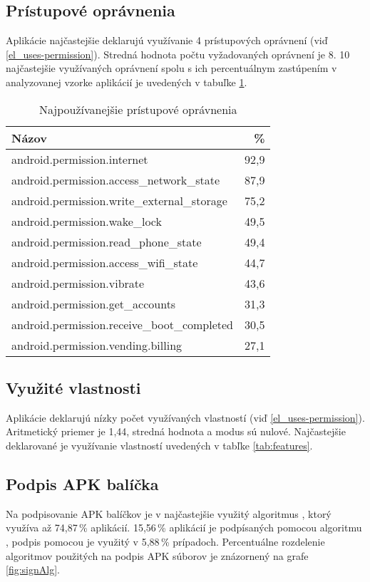 \subsection*{Prístupové oprávnenia}

Aplikácie najčastejšie deklarujú využívanie 4 prístupových oprávnení (viď \ref{el_uses-permission}). Stredná hodnota počtu vyžadovaných oprávnení je 8. 10 najčastejšie využívaných oprávnení spolu s ich percentuálnym zastúpením v analyzovanej vzorke aplikácií je uvedených v tabuľke \ref{tab:permissions}. 
\begin{table}[!htbp]
\centering
  \begin{tabular}{|l r|}
    \hline
    Názov & \% \\\hline\hline
    android.permission.internet & 92,9 \\
    android.permission.access\_network\_state & 87,9 \\
    android.permission.write\_external\_storage & 75,2 \\
    android.permission.wake\_lock & 49,5 \\
    android.permission.read\_phone\_state & 49,4 \\
    android.permission.access\_wifi\_state & 44,7 \\
    android.permission.vibrate & 43,6 \\
    android.permission.get\_accounts & 31,3 \\
    android.permission.receive\_boot\_completed & 30,5 \\
    android.permission.vending.billing & 27,1 \\
    \hline
  \end{tabular}
  \caption{Najpoužívanejšie prístupové oprávnenia}
  \label{tab:permissions}
\end{table}

\subsection*{Využité vlastnosti}
Aplikácie deklarujú nízky počet využívaných vlastností (viď \ref{el_uses-permission}). Aritmetický priemer je 1,44, stredná hodnota a modus sú nulové. Najčastejšie deklarované je využívanie vlastností uvedených v tabľke \ref{tab:features}.

\subsection*{Podpis APK balíčka}
Na podpisovanie APK balíčkov je v najčastejšie využitý algoritmus , ktorý využíva až 74,87\,\% aplikácií. 15,56\,\% aplikácií je podpísaných pomocou algoritmu , podpis pomocou  je využitý v 5,88\,\% prípadoch. Percentuálne rozdelenie algoritmov použitých na podpis APK súborov je znázornený na grafe \ref{fig:signAlg}.


